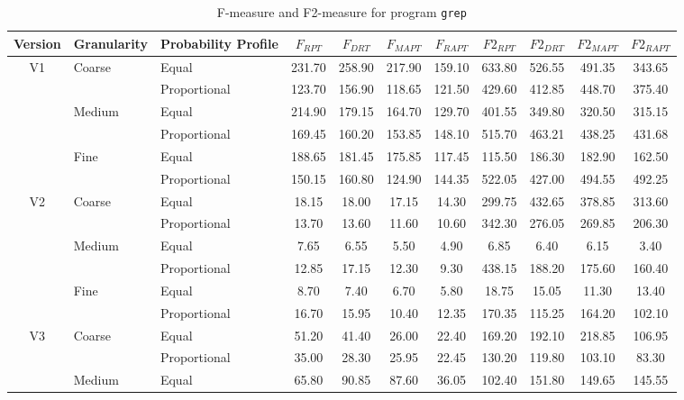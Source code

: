 \documentclass[10pt,journal,compsoc]{IEEEtran}
\begin{document}
\begin{table}
\caption{F-measure and F2-measure for program \texttt{grep}}
\label{tab:Fgrep}
\centering
\begin{tabular}{|c|l|l|c|c|c|c|c|c|c|c|} \hline
Version	& Granularity	& Probability Profile	& $F_{RPT}$	& $F_{DRT}$	& $F_{MAPT}$	& $F_{RAPT}$	& $F2_{RPT}$	& $F2_{DRT}$	& $F2_{MAPT}$	 & $F2_{RAPT}$	\\ \hline
V1	& Coarse	& Equal					& 231.70	& 258.90	& 217.90	& 159.10	& 633.80	& 526.55	& 491.35	& 343.65	\\ \cline{3-11}
		&					& Proportional	& 123.70	& 156.90	& 118.65	& 121.50	& 429.60	& 412.85	& 448.70	& 375.40	\\ \cline{2-11}
		& Medium	& Equal					& 214.90	& 179.15	& 164.70	& 129.70	& 401.55	& 349.80	& 320.50	& 315.15	\\ \cline{3-11}
		&					& Proportional	& 169.45	& 160.20	& 153.85	& 148.10	& 515.70	& 463.21	& 438.25	& 431.68	\\ \cline{2-11}
		& Fine		& Equal					& 188.65	& 181.45	& 175.85	& 117.45	& 115.50	& 186.30	& 182.90	& 162.50	\\ \cline{3-11}
		&					& Proportional	& 150.15	& 160.80	& 124.90	& 144.35	& 522.05	& 427.00	& 494.55	& 492.25	\\ \hline
V2	& Coarse	& Equal					& 18.15		& 18.00		& 17.15		& 14.30		& 299.75	& 432.65	& 378.85	& 313.60	\\ \cline{3-11}
		&					& Proportional	& 13.70		& 13.60		& 11.60		& 10.60		& 342.30	& 276.05	& 269.85	& 206.30	\\ \cline{2-11}
		& Medium	& Equal					& 7.65		& 6.55		& 5.50		& 4.90		& 6.85		& 6.40		& 6.15		& 3.40		\\ \cline{3-11}
		&					& Proportional	& 12.85		& 17.15		& 12.30		& 9.30		& 438.15	& 188.20	& 175.60	& 160.40	\\ \cline{2-11}
		& Fine		& Equal					& 8.70		& 7.40		& 6.70		& 5.80		& 18.75		& 15.05		& 11.30		& 13.40		\\ \cline{3-11}
		&					& Proportional	& 16.70		& 15.95		& 10.40		& 12.35		& 170.35	& 115.25	& 164.20	& 102.10	\\ \hline
V3	& Coarse	& Equal					& 51.20	& 41.40	& 26.00	& 22.40	& 169.20	& 192.10	& 218.85	& 106.95	\\ \cline{3-11}
		&					& Proportional	& 35.00	& 28.30	& 25.95	& 22.45	& 130.20	& 119.80	& 103.10	& 83.30		\\ \cline{2-11}
		& Medium	& Equal					& 65.80	& 90.85	& 87.60	& 36.05	& 102.40	& 151.80	& 149.65	& 145.55	\\ \cline{3-11}

\end{tabular}
\end{table}
\end{document}

